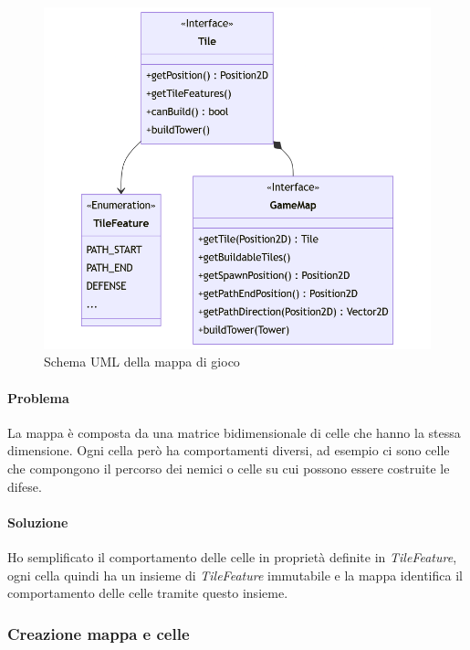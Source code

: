 \documentclass[a4paper,12pt]{report}
\begin{document}
\begin{figure}[H]
	\centering{}
	\includegraphics[width=\textwidth]{GameMap}
	\caption{Schema UML della mappa di gioco}
	\label{fig:GameMap}
\end{figure}

\paragraph{Problema} La mappa è composta da una matrice bidimensionale di celle che hanno la stessa dimensione. Ogni
cella però ha comportamenti diversi, ad esempio ci sono celle che compongono il percorso dei nemici o celle su cui
possono essere costruite le difese.
\paragraph{Soluzione} Ho semplificato il comportamento delle celle in proprietà definite in \textit{TileFeature}, ogni
cella quindi ha un insieme di \textit{TileFeature} immutabile e la mappa identifica il comportamento delle celle tramite
questo insieme.

\subsubsection{Creazione mappa e celle}
\end{document}
